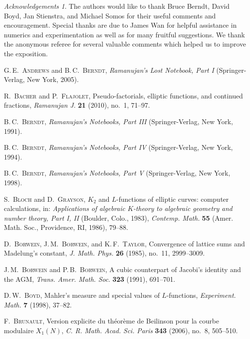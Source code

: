 \documentclass[12pt,reqno]{amsart}
\theoremstyle{remark}
\newtheorem*{acknowledgements}{Acknowledgements}
\begin{document}
\begin{acknowledgements}
The authors would like to thank Bruce Berndt, David Boyd, Jan Stienstra, and Michael Somos
for their useful comments and encouragement. Special thanks are due to James Wan
for helpful assistance in numerics and experimentation as well as for many
fruitful suggestions. We thank the anonymous referee for several valuable comments
which helped us to improve the exposition.
\end{acknowledgements}

\begin{thebibliography}{99}

\textsc{G.\,E.~Andrews} and \textsc{B.\,C.~Berndt},
\emph{Ramanujan's Lost Notebook, Part I}
(Springer-Verlag, New York, 2005).

\textsc{R.~Bacher} and \textsc{P.~Flajolet},
Pseudo-factorials, elliptic functions, and continued fractions,
\emph{Ramanujan J.} \textbf{21} (2010), no.~1, 71--97.

\textsc{B.\,C.~Berndt},
\emph{Ramanujan's Notebooks, Part III}
(Springer-Verlag, New York, 1991).

\textsc{B.\,C.~Berndt},
\emph{Ramanujan's Notebooks, Part IV}
(Springer-Verlag, New York, 1994).

\textsc{B.\,C.~Berndt},
\emph{Ramanujan's Notebooks, Part V}
(Springer-Verlag, New York, 1998).

\textsc{S.~Bloch} and \textsc{D.~Grayson},
$K_2$ and $L$-functions of elliptic curves: computer calculations,
in: \emph{Applications of algebraic $K$-theory to algebraic geometry and number theory, Part I, II}
(Boulder, Colo., 1983),
\emph{Contemp. Math.} \textbf{55} (Amer. Math. Soc., Providence, RI, 1986), 79--88.

\textsc{D.~Borwein}, \textsc{J.\,M.~Borwein}, and \textsc{K.\,F.~Taylor},
Convergence of lattice sums and Madelung's constant,
\emph{J. Math. Phys.} \textbf{26} (1985), no.~11, 2999--3009.

\textsc{J.\,M.~Borwein} and \textsc{P.\,B.~Borwein},
A cubic counterpart of Jacobi's identity and the AGM,
\emph{Trans. Amer. Math. Soc}. \textbf{323} (1991), 691--701.

\textsc{D.\,W.~Boyd},
Mahler's measure and special values of $L$-functions,
\emph{Experiment. Math.} \textbf{7} (1998), 37--82.

\textsc{F.~Brunault},
Version explicite du th\'eor\`eme de Beilinson pour la courbe modulaire $X_1(N)$,
\emph{C. R. Math. Acad. Sci. Paris} \textbf{343} (2006), no.~8, 505--510.


\end{thebibliography}
\end{document}
